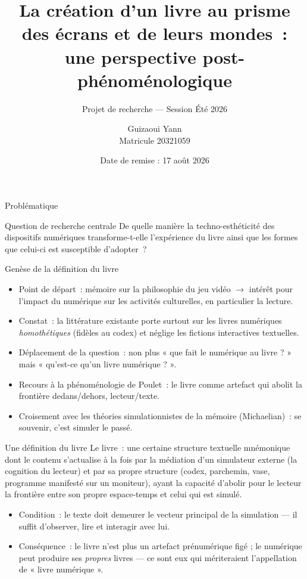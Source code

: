 \documentclass[xcolor=monochrome,11pt]{beamer}
\title{La création d'un livre au prisme des écrans et de leurs mondes~:\\
une perspective post-phénoménologique}
\subtitle{Projet de recherche --- Session Été 2026}
\author{Guizaoui Yann \\ \small Matricule 20321059}
\institute{Remis à Michael Sinatra \\ Université de Montréal \\ Département de littératures et de langues du monde}
\date{Date de remise : 17 août 2026}
\begin{document}
\begin{frame}
  \titlepage
\end{frame}

\begin{frame}{Problématique}
  \begin{block}{Question de recherche centrale}
    De quelle manière la techno-esthéticité des dispositifs numériques
    transforme-t-elle l'expérience du livre ainsi que les formes que
    celui-ci est susceptible d'adopter~?
  \end{block}
\end{frame}

\begin{frame}{Genèse de la définition du livre}
  \footnotesize
  \begin{itemize}
    \item Point de départ~: mémoire sur la philosophie du jeu vidéo
      $\rightarrow$ intérêt pour l'impact du numérique sur les activités
      culturelles, en particulier la lecture.
    \item Constat~: la littérature existante porte surtout sur les livres
      numériques \emph{homothétiques} (fidèles au codex) et néglige les
      fictions interactives textuelles.
    \item Déplacement de la question~: non plus « que fait le numérique au
      livre ? » mais « qu'est-ce qu'un livre numérique ? ».
    \item Recours à la phénoménologie de Poulet~: le livre comme artefact
      qui abolit la frontière dedans/dehors, lecteur/texte.
    \item Croisement avec les théories simulationnistes de la mémoire
      (Michaelian)~: se souvenir, c'est simuler le passé.
  \end{itemize}
\end{frame}

\begin{frame}{Une définition du livre}
  \footnotesize
  Le livre~: une certaine structure textuelle mnémonique dont le contenu
  s'actualise à la fois par la médiation d'un simulateur externe (la
  cognition du lecteur) et par sa propre structure (codex, parchemin, vase,
  programme manifesté sur un moniteur), ayant la capacité d'abolir pour le
  lecteur la frontière entre son propre espace-temps et celui qui est
  simulé.
  \vspace{0.3cm}
  \begin{itemize}
    \item Condition~: le texte doit demeurer le vecteur principal de la
      simulation --- il suffit d'observer, lire et interagir avec lui.
    \item Conséquence~: le livre n'est plus un artefact prénumérique figé ;
      le numérique peut produire ses \emph{propres} livres --- ce sont eux
      qui mériteraient l'appellation de « livre numérique ».
  \end{itemize}
\end{frame}
\end{document}
